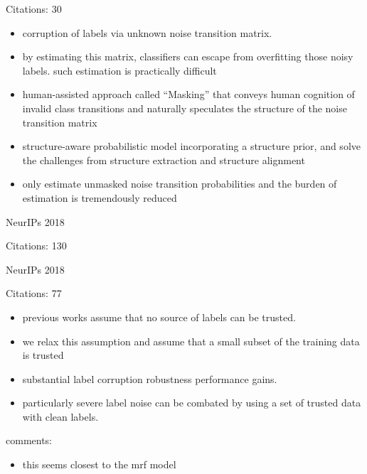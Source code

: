 \documentclass[11pt]{article}
\begin{document}
\noindent Citations: 30

\begin{itemize}
  \item corruption of labels via unknown noise transition matrix.
  \item by estimating this matrix, classifiers can escape from overfitting those noisy labels. such estimation is practically difficult
  \item human-assisted approach called “Masking” that conveys human cognition of invalid class transitions and naturally speculates the structure of the noise transition matrix
  \item structure-aware probabilistic model incorporating a structure prior, and solve the challenges from structure extraction and structure alignment
  \item only estimate unmasked noise transition probabilities and the burden of estimation is tremendously reduced
\end{itemize}

\vspace{2cm}

\noindent NeurIPs 2018

\noindent Citations: 130

\vspace{2cm}

\noindent NeurIPs 2018

\noindent Citations: 77

\begin{itemize}
\item previous works assume that no source of labels can be trusted. 
\item we relax this assumption and assume that a small subset of the training data is trusted
\item substantial label corruption robustness performance gains.
\item particularly severe label noise can be combated by using a set of trusted data with clean labels.
\end{itemize}

\noindent comments:
\begin{itemize}
\item this seems closest to the mrf model
\end{itemize}

\vspace{2cm}
\end{document}
